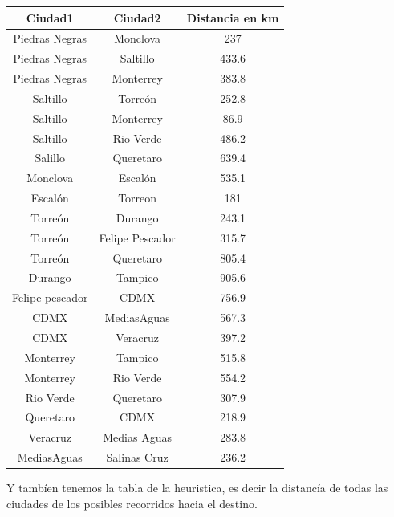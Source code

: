 \documentclass[14pt,letterpaper]{article}
\begin{document}
\begin{enumerate}
\begin{enumerate}
      \begin{table}[h]
        \centering
        \begin{tabular}{|c|c|c|}
          \hline
              {\bf Ciudad1} & {\bf Ciudad2} & {\bf Distancia en km}\\\hline
              Piedras Negras & Monclova &  237\\\hline
              Piedras Negras & Saltillo &  433.6\\\hline
              Piedras Negras & Monterrey & 383.8\\\hline
              Saltillo & Torreón & 252.8 \\\hline
              Saltillo & Monterrey & 86.9\\\hline
              Saltillo & Rio Verde & 486.2\\\hline
              Salillo & Queretaro & 639.4\\\hline
              Monclova & Escalón & 535.1\\\hline
              Escalón & Torreon & 181 \\\hline
              Torreón & Durango & 243.1 \\\hline
              Torreón & Felipe Pescador & 315.7\\\hline
              Torreón & Queretaro & 805.4\\\hline
              Durango & Tampico & 905.6\\\hline
              Felipe pescador & CDMX & 756.9\\\hline
              CDMX & MediasAguas & 567.3\\\hline
              CDMX & Veracruz & 397.2\\\hline
              Monterrey & Tampico & 515.8\\\hline
              Monterrey & Rio Verde & 554.2 \\\hline
              Rio Verde & Queretaro & 307.9 \\\hline
              Queretaro & CDMX & 218.9 \\\hline
              Veracruz & Medias Aguas & 283.8 \\\hline
              MediasAguas & Salinas Cruz & 236.2 \\\hline
        \end{tabular}
      \end{table}

      Y tambíen tenemos la tabla de la heuristica, es decir la distancía de todas las ciudades
      de los posibles recorridos hacia el destino.
      

\end{enumerate}
\end{enumerate}
\end{document}
